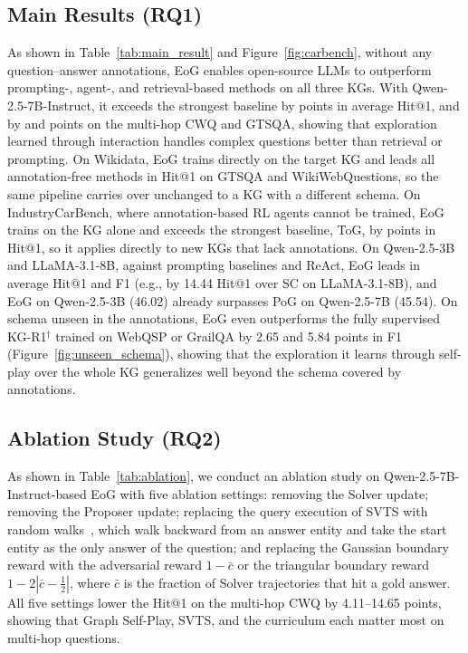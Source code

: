 

\subsection{Main Results (RQ1)}
\label{sec:main-results}
As shown in Table~\ref{tab:main_result} and Figure~\ref{fig:carbench}, without any question--answer annotations, EoG enables open-source LLMs to outperform prompting-, agent-, and retrieval-based methods on all three KGs. With Qwen-2.5-7B-Instruct, it exceeds the strongest baseline by  points in average Hit@1, and by  and  points on the multi-hop CWQ and GTSQA, showing that exploration learned through interaction handles complex questions better than retrieval or prompting. On Wikidata, EoG trains directly on the target KG and leads all annotation-free methods in Hit@1 on GTSQA and WikiWebQuestions, so the same pipeline carries over unchanged to a KG with a different schema. On IndustryCarBench, where annotation-based RL agents cannot be trained, EoG trains on the KG alone and exceeds the strongest baseline, ToG, by  points in Hit@1, so it applies directly to new KGs that lack annotations. On Qwen-2.5-3B and LLaMA-3.1-8B, against prompting baselines and ReAct, EoG leads in average Hit@1 and F1 (e.g., by 14.44 Hit@1 over SC on LLaMA-3.1-8B), and EoG on Qwen-2.5-3B (46.02) already surpasses PoG on Qwen-2.5-7B (45.54). On schema unseen in the annotations, EoG even outperforms the fully supervised KG-R1$^\dagger$ trained on WebQSP or GrailQA by 2.65 and 5.84 points in F1 (Figure~\ref{fig:unseen_schema}), showing that the exploration it learns through self-play over the whole KG generalizes well beyond the schema covered by annotations.

\subsection{Ablation Study (RQ2)}
\label{sec:ablation}
As shown in Table~\ref{tab:ablation}, we conduct an ablation study on Qwen-2.5-7B-Instruct-based EoG with five ablation settings: removing the Solver update; removing the Proposer update; replacing the query execution of SVTS with random walks~\citep{GraphWalker}, which walk backward from an answer entity and take the start entity as the only answer of the question; and replacing the Gaussian boundary reward with the adversarial reward $1-\bar{c}$ or the triangular boundary reward $1-2|\bar{c}-\frac{1}{2}|$, where $\bar{c}$ is the fraction of Solver trajectories that hit a gold answer. %
All five settings lower the Hit@1 on the multi-hop CWQ by 4.11--14.65 points, showing that Graph Self-Play, SVTS, and the curriculum each matter most on multi-hop questions.


